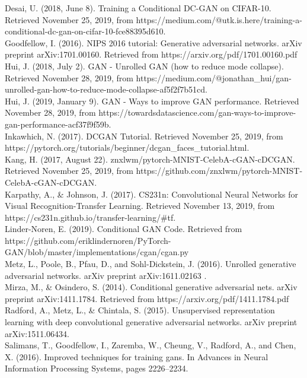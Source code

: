 \documentclass[11pt]{article}
\begin{document}
Desai, U. (2018, June 8). Training a Conditional DC-GAN on CIFAR-10.
Retrieved November 25, 2019, from
https://medium.com/@utk.is.here/training-a-conditional-dc-gan-on-cifar-10-fce88395d610.\\

Goodfellow, I. (2016). NIPS 2016 tutorial: Generative adversarial
networks. arXiv preprint arXiv:1701.00160. Retrieved from
https://arxiv.org/pdf/1701.00160.pdf\\

Hui, J. (2018, July 2). GAN - Unrolled GAN (how to reduce mode
collapse). Retrieved November 28, 2019, from
https://medium.com/@jonathan\_hui/gan-unrolled-gan-how-to-reduce-mode-collapse-af5f2f7b51cd.\\

Hui, J. (2019, January 9). GAN - Ways to improve GAN performance.
Retrieved November 28, 2019, from
https://towardsdatascience.com/gan-ways-to-improve-gan-performance-acf37f9f59b.\\

Inkawhich, N. (2017). DCGAN Tutorial. Retrieved November 25, 2019, from
https://pytorch.org/tutorials/beginner/dcgan\_faces\_tutorial.html.\\

Kang, H. (2017, August 22). znxlwm/pytorch-MNIST-CelebA-cGAN-cDCGAN.
Retrieved November 25, 2019, from
https://github.com/znxlwm/pytorch-MNIST-CelebA-cGAN-cDCGAN.\\

Karpathy, A., \& Johnson, J. (2017). CS231n: Convolutional Neural
Networks for Visual Recognition-Transfer Learning. Retrieved November
13, 2019, from https://cs231n.github.io/transfer-learning/\#tf.\\

Linder-Noren, E. (2019). Conditional GAN Code. Retrieved from
https://github.com/eriklindernoren/PyTorch-GAN/blob/master/implementations/cgan/cgan.py\\

Metz, L., Poole, B., Pfau, D., and Sohl-Dickstein, J. (2016). Unrolled
generative adversarial networks. arXiv preprint arXiv:1611.02163 .\\

Mirza, M., \& Osindero, S. (2014). Conditional generative adversarial
nets. arXiv preprint arXiv:1411.1784. Retrieved from
https://arxiv.org/pdf/1411.1784.pdf\\

Radford, A., Metz, L., \& Chintala, S. (2015). Unsupervised
representation learning with deep convolutional generative adversarial
networks. arXiv preprint arXiv:1511.06434.\\

Salimans, T., Goodfellow, I., Zaremba, W., Cheung, V., Radford, A., and
Chen, X. (2016). Improved techniques for training gans. In Advances in
Neural Information Processing Systems, pages 2226--2234.


    
    
    
    
\end{document}
